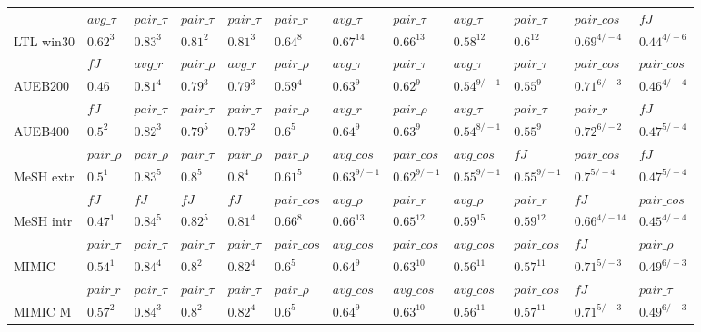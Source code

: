 \documentclass[letterpaper]{article} %
\begin{document}
\begin{table}
\begin{adjustbox}{angle=90}
\begin{tabular}{l l l l l l l l l l l l}
& $avg\_\tau$ & $pair\_\tau$ & $pair\_\tau$ & $pair\_\tau$ & $pair\_r$ & $avg\_\tau$ & $pair\_\tau$ & $avg\_\tau$ & $pair\_\tau$ & $pair\_cos$ & $fJ$ \\
LTL win30 & $0.62^{3}$ & $0.83^{3}$ & $0.81^{2}$ & $0.81^{3}$ & $0.64^{8}$ & $0.67^{14}$ & $0.66^{13}$ & $0.58^{12}$ & $0.6^{12}$ & $0.69^{4/-4}$ & $0.44^{4/-6}$ \\
& $fJ$ & $avg\_r$ & $pair\_\rho$ & $avg\_r$ & $pair\_\rho$ & $avg\_\tau$ & $pair\_\tau$ & $avg\_\tau$ & $pair\_\tau$ & $pair\_cos$ & $pair\_cos$ \\
AUEB200 & $0.46$ & $0.81^{4}$ & $0.79^{3}$ & $0.79^{3}$ & $0.59^{4}$ & $0.63^{9}$ & $0.62^{9}$ & $0.54^{9/-1}$ & $0.55^{9}$ & $0.71^{6/-3}$ & $0.46^{4/-4}$ \\
& $fJ$ & $pair\_\tau$ & $pair\_\tau$ & $pair\_\tau$ & $pair\_\rho$ & $avg\_r$ & $pair\_\rho$ & $avg\_\tau$ & $pair\_\tau$ & $pair\_r$ & $fJ$ \\
AUEB400 & $0.5^{2}$ & $0.82^{3}$ & $0.79^{5}$ & $0.79^{2}$ & $0.6^{5}$ & $0.64^{9}$ & $0.63^{9}$ & $0.54^{8/-1}$ & $0.55^{9}$ & $0.72^{6/-2}$ & $0.47^{5/-4}$ \\
 & $pair\_\rho$ & $pair\_\rho$ & $pair\_\tau$ & $pair\_\rho$ & $pair\_\rho$ & $avg\_cos$ & $pair\_cos$ & $avg\_cos$ & $fJ$ & $pair\_cos$ & $fJ$ \\
MeSH extr & $0.5^{1}$ & $0.83^{5}$ & $0.8^{5}$ & $0.8^{4}$ & $0.61^{5}$ & $0.63^{9/-1}$ & $0.62^{9/-1}$ & $0.55^{9/-1}$ & $0.55^{9/-1}$ & $0.7^{5/-4}$ & $0.47^{5/-4}$ \\
 & $fJ$ & $fJ$ & $fJ$ & $fJ$ & $pair\_cos$ & $avg\_\rho$ & $pair\_r$ & $avg\_\rho$ & $pair\_r$ & $fJ$ & $pair\_cos$ \\
MeSH intr & $0.47^{1}$ & $0.84^{5}$ & $0.82^{5}$ & $0.81^{4}$ & $0.66^{8}$ & $0.66^{13}$ & $0.65^{12}$ & $0.59^{15}$ & $0.59^{12}$ & $0.66^{4/-14}$ & $0.45^{4/-4}$ \\
 & $pair\_\tau$ & $pair\_\tau$ & $pair\_\tau$ & $pair\_\tau$ & $pair\_cos$ & $avg\_cos$ & $pair\_cos$ & $avg\_cos$ & $pair\_cos$ & $fJ$ & $pair\_\rho$ \\
MIMIC & $0.54^{1}$ & $0.84^{4}$ & $0.8^{2}$ & $0.82^{4}$ & $0.6^{5}$ & $0.64^{9}$ & $0.63^{10}$ & $0.56^{11}$ & $0.57^{11}$ & $0.71^{5/-3}$ & $0.49^{6/-3}$ \\
 & $pair\_r$ & $pair\_\tau$ & $pair\_\tau$ & $pair\_\tau$ & $pair\_\rho$ & $avg\_cos$ & $avg\_cos$ & $avg\_cos$ & $pair\_cos$ & $fJ$ & $pair\_\tau$ \\
MIMIC M & $0.57^{2}$ & $0.84^{3}$ & $0.8^{2}$ & $0.82^{4}$ & $0.6^{5}$ & $0.64^{9}$ & $0.63^{10}$ & $0.56^{11}$ & $0.57^{11}$ & $0.71^{5/-3}$ & $0.49^{6/-3}$ \\

\end{tabular}
\end{adjustbox}
\end{table}
\end{document}
